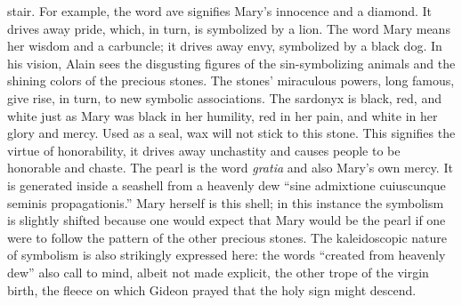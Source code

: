stair. For example, the word ave signifies Mary's innocence and a
diamond. It drives away pride, which, in turn, is symbolized by a lion.
The word Mary means her wisdom and a carbuncle; it drives away envy,
symbolized by a black dog. In his vision, Alain sees the disgusting
figures of the sin-symbolizing animals and the shining colors of the
precious stones. The stones' miraculous powers, long famous, give rise,
in turn, to new symbolic associations. The sardonyx is black, red, and
white just as Mary was black in her humility, red in her
\protect\hypertarget{16_Chapter_Nine__THE_DECLINE_OF_SYM.xhtmlux5cux23page_242}{}{}pain,
and white in her glory and mercy. Used as a seal, wax will not stick to
this stone. This signifies the virtue of honorability, it drives away
unchastity and causes people to be honorable and chaste. The pearl is
the word \emph{gratia} and also Mary's own mercy. It is generated inside
a seashell from a heavenly dew ``sine admixtione cuiuscunque seminis
propagationis.'' Mary herself is this shell; in this instance the
symbolism is slightly shifted because one would expect that Mary would
be the pearl if one were to follow the pattern of the other precious
stones. The kaleidoscopic nature of symbolism is also strikingly
expressed here: the words ``created from heavenly dew'' also call to
mind, albeit not made explicit, the other trope of the virgin birth, the
fleece on which Gideon prayed that the holy sign might descend.

